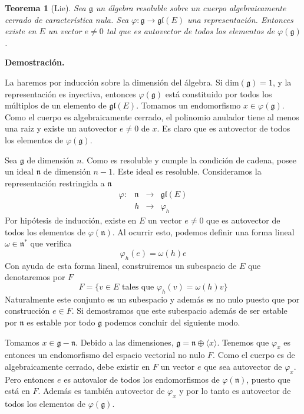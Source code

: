 \documentclass[a4paper,draft,12pt]{scrartcl}
\newtheorem{teo}{Teorema}[section]%
\newcommand{\dem}{\noindent \textbf{Demostración. }\vspace{0.3 cm}}%
\newcommand{\g}{\mathfrak{g}}%
\newcommand{\lto}{\longrightarrow}%
\begin{document}
\begin{teo}[Lie]

Sea $\g$ un álgebra resoluble sobre un cuerpo algebraicamente cerrado de característica nula.  Sea $\varphi:\g \rightarrow \mathfrak{gl}(E)$ una representación.  Entonces existe en $E$ un vector $e \neq 0$ tal que es autovector de todos los elementos de $\varphi(\g)$.


\end{teo}

\dem

La haremos por inducción sobre la dimensión del álgebra.  Si $\mathrm{dim}(\g)=1$, y la representación es inyectiva, entonces $\varphi(\g)$ está constituido por todos los múltiplos de un elemento de $\mathfrak{gl}(E)$.  Tomamos un endomorfismo $x \in \varphi(\g)$.  Como el cuerpo es algebraicamente cerrado, el polinomio anulador tiene al menos una raiz y existe un autovector $e\neq 0$ de $x$.  Es claro que es autovector de todos los elementos de $\varphi(\g)$.

\bigskip

Sea $\g$ de dimensión $n$.  Como es resoluble y cumple la condición de cadena, posee un ideal $\mathfrak{n}$ de dimensión $n-1$. Este ideal es resoluble.  Consideramos la representación restringida a $\mathfrak{n}$
$$
\begin{array}{lccc}
\varphi :&\mathfrak{n}&\lto &\mathfrak{gl}(E)\\
         &  h &\lto & \varphi_h
\end{array}
$$
Por hipótesis de inducción, existe en $E$ un vector $e\neq 0$ que es autovector de todos los elementos de $\varphi(\mathfrak{n})$.  Al ocurrir esto, podemos definir una forma lineal $\omega \in \mathfrak{n}^*$ que verifica
$$
\varphi_h(e) = \omega(h)e
$$
Con ayuda de esta forma lineal, construiremos un subespacio de $E$ que denotaremos por $F$
$$
F=\{v \in E \text{ tales que } \varphi_h(v) = \omega(h)v \}
$$
Naturalmente este conjunto es un subespacio y además es no nulo puesto que por construcción $e \in F$.  Si demostramos que este subespacio además de ser estable por $\mathfrak{n}$ es estable por todo $\g$ podemos concluir del siguiente modo. 

 Tomamos $x \in \g -\mathfrak{n}$.  Debido a las dimensiones, $\g= \mathfrak{n}\oplus \langle x\rangle$.  Tenemos que $\varphi_x$ es entonces un endomorfismo del espacio vectorial no nulo $F$.  Como el cuerpo es de algebraicamente cerrado, debe existir en $F$ un vector $e$ que sea autovector  de $\varphi_x$.  Pero entonces $e$ es autovalor de todos los endomorfismos de $\varphi(\mathfrak{n})$, puesto que está en $F$.  Además es también autovector de $\varphi_x$ y por lo tanto es autovector de todos los elementos de $\varphi(\g)$.
\end{document}
